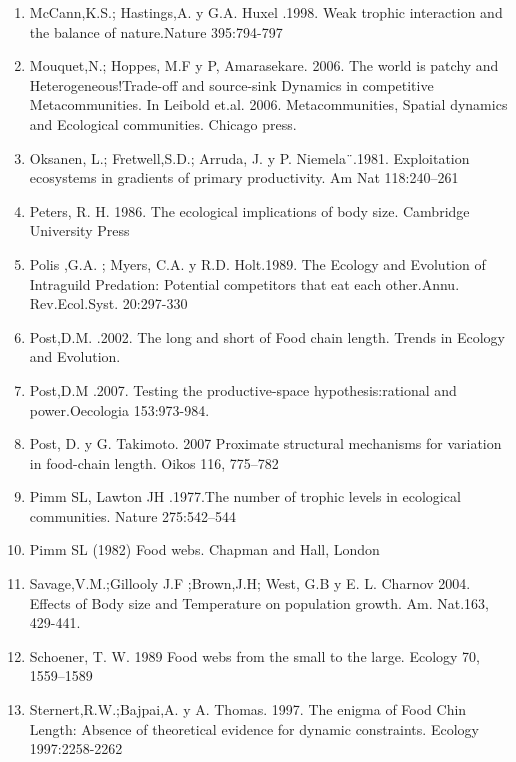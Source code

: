\documentclass[a4paper,11pt]{article}
\begin{document}
\begin{enumerate}
\item McCann,K.S.; Hastings,A. y G.A. Huxel .1998. Weak trophic interaction and the balance of nature.Nature 395:794-797\\
\item Mouquet,N.; Hoppes, M.F y P, Amarasekare. 2006. The world is patchy and Heterogeneous!Trade-off and source-sink Dynamics in competitive Metacommunities. In Leibold et.al. 2006. Metacommunities, Spatial dynamics and Ecological communities. Chicago press.\\
\item Oksanen, L.; Fretwell,S.D.; Arruda, J. y P. Niemela¨.1981. Exploitation ecosystems in gradients of primary productivity. Am Nat 118:240–261\\
\item Peters, R. H. 1986. The ecological implications of body size. Cambridge University Press\\
\item Polis ,G.A. ; Myers, C.A. y R.D. Holt.1989. The Ecology and Evolution of Intraguild Predation: Potential competitors that eat each other.Annu. Rev.Ecol.Syst. 20:297-330\\
\item Post,D.M. .2002. The long and short of Food chain length. Trends in Ecology and Evolution.\\
\item Post,D.M .2007. Testing the productive-space hypothesis:rational and power.Oecologia 153:973-984.\\
\item Post, D. y G. Takimoto. 2007 Proximate structural mechanisms for variation in food-chain length. Oikos 116, 775–782\\
\item Pimm SL, Lawton JH .1977.The number of trophic levels in ecological communities. Nature 275:542–544\\
\item Pimm SL (1982) Food webs. Chapman and Hall, London \\
\item Savage,V.M.;Gillooly J.F ;Brown,J.H; West, G.B y E. L. Charnov 2004. Effects of Body size and Temperature on population growth. Am. Nat.163, 429-441.\\
\item Schoener, T. W. 1989 Food webs from the small to the large. Ecology 70, 1559–1589\\
\item Sternert,R.W.;Bajpai,A. y A. Thomas. 1997. The enigma of Food Chin Length: Absence of theoretical evidence for dynamic constraints. Ecology 1997:2258-2262\\

\end{enumerate}
\end{document}
